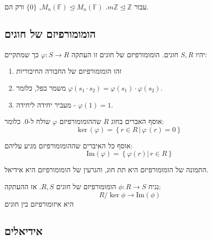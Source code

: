 \documentclass{tstextbook}
\begin{document}
\begin{example}
עבור \(m\mathbb{Z} \trianglelefteq \mathbb{Z}\). \(M_{n}\left( \mathbb{F} \right)\trianglelefteq M_{n}\left( \mathbb{F} \right)\), \(\{ 0 \}\) ורק הם.

\end{example}
\subsection{הומומורפיזם של חוגים}

\begin{definition}
יהיו \(S,R\) חוגים. הומומורפיזם של חוגים זו העתקה \(\varphi:S\to R\) כך שמתקיים:

  \begin{enumerate}
    \item זהו הומומורפיזם של החבורה החיבוריות 


    \item משמר כפל, כלומר \(\varphi\left( s_{1}\cdot s_{2} \right)=\varphi(s_{1})\cdot \varphi(s_{2})\). 


    \item מעביר יחידה ליחידה - \(\varphi(1)=1\). 


  \end{enumerate}
\end{definition}
\begin{definition}
אוסף האברים בחוג \(R\) שההומומורפיזם \(\varphi\) שולח ל-0. כלומר:
$${\mathrm{ker}}\,\left( \varphi \right)=\left\{r\in R\,|\,\varphi\,(r)=0\right\}$$

\end{definition}
\begin{definition}
אוסף כל האיברים שההומומורפיזם מגיע עליהם:
$${\mathrm{Im}}\left( \varphi \right)=\left\{\varphi\left(r\right)\left|\,r\in R\right\}\right.$$

\end{definition}
\begin{proposition}
התמונה של הומומורפיזם היא תת חוג, והגרעין של הומומורפיזם היא אידיאל.

\end{proposition}
\begin{proposition}
נניח \(\phi:R\to S\) הומומורפיזם של חוגים \(R,S\). אז ההעתקה:
$$R / \ker \phi \to \mathrm{Im}\left( \phi \right)$$
היא איזומורפיזם בין חוגים

\end{proposition}
\subsection{אידיאלים}
\end{document}
